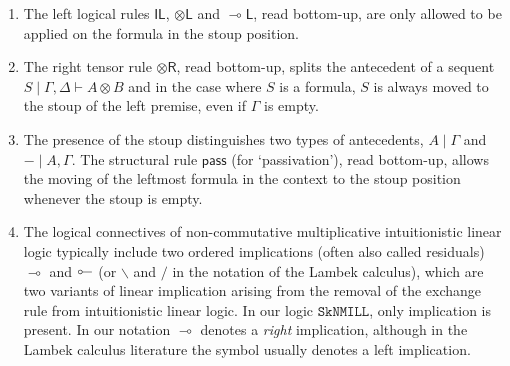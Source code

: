 \documentclass[sn-mathphys-num]{sn-jnl}%
\newcommand{\GG}{\Gamma}
\newcommand{\GD}{\Delta}
\newcommand{\vd}{\vdash}
\newcommand{\tl}{\otimes \mathsf{L}}
\newcommand{\tr}{\otimes\mathsf{R}}
\newcommand{\pass}{\mathsf{pass}}
\newcommand{\unitl}{\mathsf{IL}}
\newcommand{\ot}{\otimes}
\newcommand{\lolli}{\multimap}
\newcommand{\lleft}{{\lolli}\mathsf{L}}
\newcommand{\illol}{\rotatebox[origin=c]{180}{$\multimap$}}
\newcommand{\unit}{\mathsf{I}}
\newcommand{\sls}{\slash}
\newcommand{\bsls}{\backslash}
\newcommand{\NMILL}{$\mathtt{NMILL}$}
\newcommand{\SkNMILL}{$\mathtt{SkNMILL}$}
\theoremstyle{thmstyleone}%
\theoremstyle{thmstyletwo}%
\theoremstyle{thmstylethree}%
\begin{document}
\begin{enumerate}
  \item The left logical rules $\unitl$, $\tl$ and $\lleft$, read bottom-up, are only allowed to be applied on the formula in the stoup position.
  \item The right tensor rule $\tr$, read bottom-up, splits the antecedent of a sequent $S \mid \GG, \GD \vd A \ot B$ and in the case where $S$ is a formula, $S$ is always moved to the stoup of the left premise, even if $\GG$ is empty.
  \item The presence of the stoup distinguishes two types of antecedents, $A \mid \GG$ and ${-} \mid A, \GG$. The structural rule $\pass$ (for `passivation'), read bottom-up, allows the moving of the leftmost formula in the context to the stoup position whenever the stoup is empty.
  \item The logical connectives of non-commutative multiplicative intuitionistic linear logic typically include two ordered implications (often also called residuals) $\lolli$ and $\illol$ (or $\bsls$ and $\sls$ in the notation of the Lambek calculus), which are two variants of linear implication arising from the removal of the exchange rule from intuitionistic linear logic.
  In our logic \SkNMILL, only implication is present. In our notation $\lolli$  denotes a \emph{right} implication, although in the Lambek calculus literature the symbol usually denotes a left implication. 
\end{enumerate}
\end{document}
